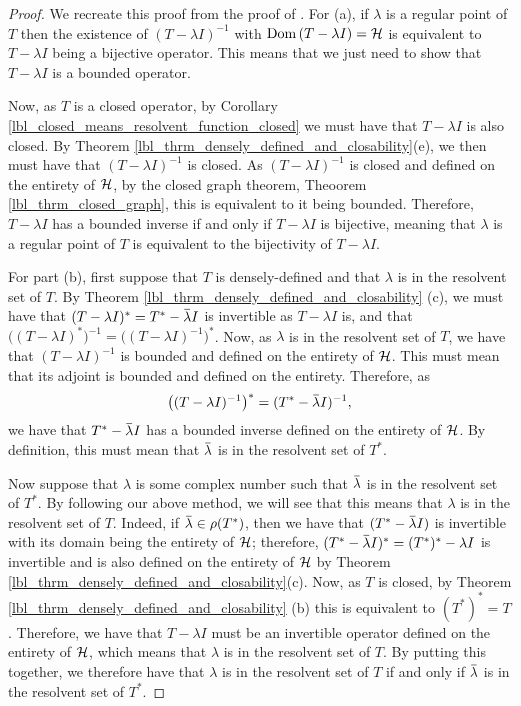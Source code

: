 \begin{proof}
  We recreate this proof from the proof of {\cite[Proposition 2.7]{konrad}}. For (a), if $\lambda$ is a regular point of $T$ then the existence of $(T - \lambda I)^{-1}$ with $\operatorname{Dom}\left(T - \lambda I\right) = \mathcal{H}$ is equivalent to $T - \lambda I$ being a bijective operator. This means that we just need to show that $T - \lambda I$ is a bounded operator.

  Now, as $T$ is a closed operator, by Corollary \eqref{lbl_closed_means_resolvent_function_closed} we must have that $T  - \lambda I$ is also closed. By Theorem \eqref{lbl_thrm_densely_defined_and_closability}(e), we then must have that $(T - \lambda I)^{-1}$ is closed. As $(T - \lambda I)^{-1}$ is closed and defined on the entirety of $\mathcal{H}$, by the closed graph theorem, Theoorem \eqref{lbl_thrm_closed_graph}, this is equivalent to it being bounded. Therefore, $T - \lambda I$ has a bounded inverse if and only if $T - \lambda I$ is bijective, meaning that $\lambda$ is a regular point of $T$ is equivalent to the bijectivity of $T - \lambda I$.

  \medskip

  For part (b), first suppose that $T$ is densely-defined and that $\lambda$ is in the resolvent set of $T$. By Theorem \eqref{lbl_thrm_densely_defined_and_closability} (c), we must have that $(T - \lambda I)^* = T^* - \conjugate{\lambda}I$ is invertible as $T - \lambda I$ is, and that $\big( (T - \lambda I)^* \big)^{-1} = \big( (T - \lambda I)^{-1} \big)^*$. Now, as $\lambda$ is in the resolvent set of $T$, we have that $(T - \lambda I)^{-1}$ is bounded and defined on the entirety of $\mathcal{H}$. This must mean that its adjoint is bounded and defined on the entirety. Therefore, as
  \begin{equation*}
    \big( (T - \lambda I)^{-1} \big)^*
    =
    (T^* - \conjugate{\lambda} I)^{-1},
  \end{equation*}
  we have that $T^* - \conjugate{\lambda} I$ has a bounded inverse defined on the entirety of $\mathcal{H}$. By definition, this must mean that $\conjugate{\lambda}$ is in the resolvent set of $T^*$.

  Now suppose that $\lambda$ is some complex number such that $\conjugate{\lambda}$ is in the resolvent set of $T^*$. By following our above method, we will see that this means that $\lambda$ is in the resolvent set of $T$. Indeed, if $\conjugate{\lambda} \in \rho(T^*)$, then we have that $(T^* - \conjugate{\lambda} I)$ is invertible with its domain being the entirety of $\mathcal{H}$; therefore, $(T^* - \conjugate{\lambda} I)^* = (T^*)^* - \lambda I$ is invertible  and is also defined on the entirety of $\mathcal{H}$ by Theorem \eqref{lbl_thrm_densely_defined_and_closability}(c).  Now, as $T$ is closed, by Theorem \eqref{lbl_thrm_densely_defined_and_closability} (b) this is equivalent to $(T^*)^* = T$. Therefore, we have that $T - \lambda I$ must be an invertible operator defined on the entirety of $\mathcal{H}$, which means that $\lambda$ is in the resolvent set of $T$. By putting this together, we therefore have that $\lambda$ is in the resolvent set of $T$ if and only if $\conjugate{\lambda}$ is in the resolvent set of $T^*$.


\end{proof}
